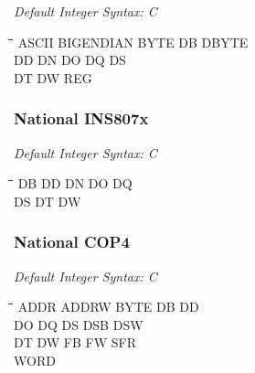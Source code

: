 {\em Default Integer Syntax: C}

{\tt\begin{tabbing}
\hspace{3cm}\=\hspace{3cm}\=\hspace{3cm}\=\hspace{3cm}\=\kill
ASCII      \> BIGENDIAN  \> BYTE        \> DB          \> DBYTE \\
DD         \> DN         \> DO          \> DQ          \> DS \\
DT         \> DW         \> REG \\
\end{tabbing}}
	
\subsubsection{National INS807x}

{\em Default Integer Syntax: C}

{\tt\begin{tabbing}
\hspace{3cm}\=\hspace{3cm}\=\hspace{3cm}\=\hspace{3cm}\=\kill
DB         \> DD          \> DN          \> DO         \> DQ \\
DS         \> DT          \> DW \\
\end{tabbing}}
        
\subsubsection{National COP4}

{\em Default Integer Syntax: C}

{\tt\begin{tabbing}
\hspace{3cm}\=\hspace{3cm}\=\hspace{3cm}\=\hspace{3cm}\=\kill
ADDR       \> ADDRW       \> BYTE        \> DB          \> DD \\
DO         \> DQ          \> DS          \> DSB         \> DSW \\
DT         \> DW          \> FB          \> FW          \> SFR \\
WORD \\
\end{tabbing}}

